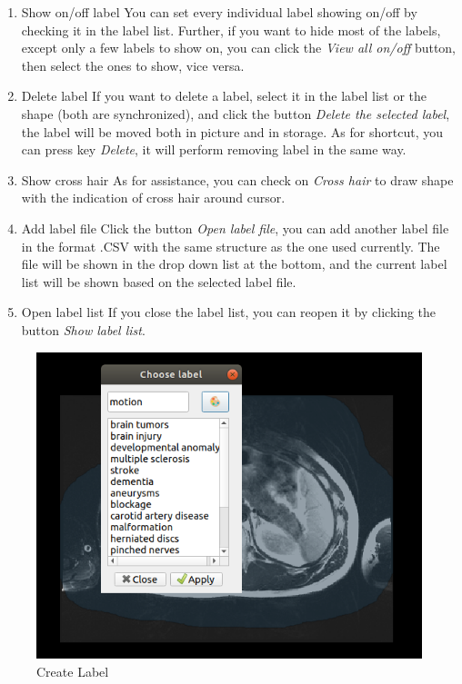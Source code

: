 \documentclass[12pt]{article}
\begin{document}
\begin{enumerate}
	\item Show on/off label
	\newline You can set every individual label showing on/off by checking it in the label list. Further, if you want to hide most of the labels, except only a few labels to show on, you can click the \textit{View all on/off} button, then select the ones to show,  vice versa.
	\item Delete label
	\newline If you want to delete a label, select it in the label list or the shape (both are synchronized), and click the button \textit{Delete the selected label}, the label will be moved both in picture and in storage. As for shortcut, you can press key \textit{Delete}, it will perform removing label in the same way.
	\item Show cross hair
	\newline As for assistance, you can check on \textit{Cross hair} to draw shape with the indication of cross hair around cursor.
	\item Add label file
	\newline Click the button \textit{Open label file}, you can add another label file in the format .CSV with the same structure as the one used currently. The file will be shown in the drop down list at the bottom, and the current label list will be shown based on the selected label file.
	\item Open label list
	\newline If you close the label list, you can reopen it by clicking the button \textit{Show label list}.
\end{enumerate}
\begin{figure}[htbp]	
	\centering
	\includegraphics[width=\linewidth]{create_label.png}
	\caption[Create Label]{Create Label}
	\label{fig:create_label}
\end{figure}
\end{document}
